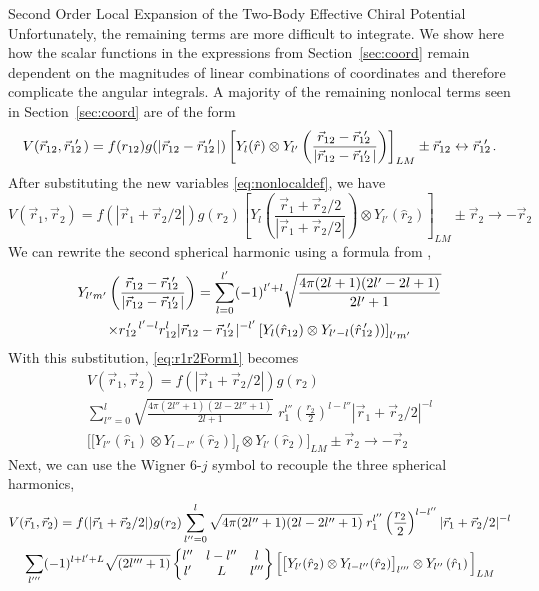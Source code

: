 \begin{section}{Second Order Local Expansion of the Two-Body Effective Chiral Potential\label{sec:localChiral}}
Unfortunately, the remaining terms are more difficult to integrate. We show here how the scalar functions in the expressions from Section~\ref{sec:coord} remain dependent on the magnitudes of linear combinations of coordinates and therefore complicate the angular integrals. A majority of the remaining nonlocal terms seen in Section~\ref{sec:coord} are of the form
%
\begin{equation}
V(\rot,\rotp)=f(r_{12})g(|\rot-\rotp |) \left[Y_{l}(\hat{r})\otimes Y_{l'}\left(\frac{\rot-\rotp}{|\rot-\rotp |}\right)\right]_{L M}\pm \rot\leftrightarrow \rotp.
\end{equation}
%
After substituting the new variables \eqref{eq:nonlocaldef}, we have
%
\begin{equation}\label{eq:r1r2Form1}
V(\vec{r}_1,\vec{r}_2)=f(|\vec{r}_1+\vec{r}_2/2|)g(r_2) \left[Y_{l}\left(\frac{\vec{r}_1+\vec{r}_2/2}{|\vec{r}_1+\vec{r}_2/2|}\right)\otimes Y_{l'}\left(\hat{r}_2\right)\right]_{L M} \pm \vec{r}_2\rightarrow -\vec{r}_2
\end{equation} 
%
We can rewrite the second spherical harmonic using a formula from \cite{varshalovich1988},
%
\begin{multline}
Y_{l'm'}\left(\frac{\rot-\rotp}{|\rot-\rotp |}\right) = \sum_{l=0}^{l'}(-1)^{l'+l}\sqrt{\frac{4\pi(2l+1)(2l'-2l+1)}{2l'+1}} \\
\times \rotpr^{l'-l} r_{12}^l |\rot-\rotp|^{-l'}\left[Y_{l}(\hat{r}_{12})\otimes Y_{l'-l}(\rotphat))\right]_{l'm'}
\end{multline}
With this substitution, \eqref{eq:r1r2Form1} becomes
\begin{multline}
V(\vec{r}_1,\vec{r}_2)=f(|\vec{r}_1+\vec{r}_2/2|)g(r_2) \\
\sum_{l''=0}^{l} \sqrt{\frac{4\pi(2l''+1)(2l-2l''+1)}{2l+1}} \;r_1^{l''} \left(\frac{r_2}{2}\right)^{l-l''}|\vec{r}_1+\vec{r}_2/2|^{-l} \\
 \Big[\big[Y_{l''}(\hat{r}_1) \otimes Y_{l-l''}(\hat{r}_2) \big]_l \otimes Y_{l'}\left(\hat{r}_2\right)\Big]_{L M} \pm \vec{r}_2 \rightarrow -\vec{r}_2
\end{multline}
Next, we can use the Wigner 6-$j$ symbol to recouple the three spherical harmonics, 
\begin{multline}
V(\vec{r}_1,\vec{r}_2)=f(|\vec{r}_1+\vec{r}_2/2|)g(r_2) 
\sum_{l''=0}^{l} \sqrt{4\pi(2l''+1)(2l-2l''+1)} \;r_1^{l''} \left(\frac{r_2}{2}\right)^{l-l''}|\vec{r}_1+\vec{r}_2/2|^{-l} \\
\sum_{l'''} (-1)^{l+l'+L} \sqrt{(2l'''+1)} \sixj{l''}{l-l''}{l}{l'}{L}{l'''} \Big[\big[Y_{l'}(\hat{r}_2) \otimes Y_{l-l''}(\hat{r}_2) \big]_{l'''} \otimes Y_{l''}\left(\hat{r}_1\right)\Big]_{L M} \\

\end{multline}
\end{section}

